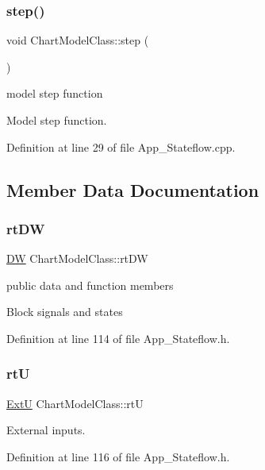 \subsubsection{\texorpdfstring{step()}{step()}}
{\footnotesize\ttfamily void Chart\+Model\+Class\+::step (\begin{DoxyParamCaption}{ }\end{DoxyParamCaption})}



model step function 

Model step function. 

Definition at line 29 of file App\+\_\+\+Stateflow.\+cpp.



\subsection{Member Data Documentation}
\mbox{\label{class_chart_model_class_a1c2dcf4c77e74c040501b76bd18eebf8}} 
\subsubsection{\texorpdfstring{rt\+DW}{rtDW}}
{\footnotesize\ttfamily \mbox{\hyperlink{struct_d_w}{DW}} Chart\+Model\+Class\+::rt\+DW}



public data and function members 

Block signals and states 

Definition at line 114 of file App\+\_\+\+Stateflow.\+h.

\mbox{\label{class_chart_model_class_aa557038e416c73872f813e4206084532}} 
\subsubsection{\texorpdfstring{rtU}{rtU}}
{\footnotesize\ttfamily \mbox{\hyperlink{struct_ext_u}{ExtU}} Chart\+Model\+Class\+::rtU}



External inputs. 



Definition at line 116 of file App\+\_\+\+Stateflow.\+h.


